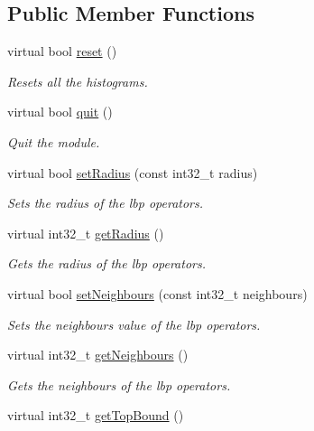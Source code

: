 \subsection*{Public Member Functions}
\begin{DoxyCompactItemize}
\item 
virtual bool \hyperlink{classlbpExtract__IDLServer_a9d9b1223c68851e94b0c8c0bd8d3cedc}{reset} ()
\begin{DoxyCompactList}\small\item\em Resets all the histograms. \end{DoxyCompactList}\item 
virtual bool \hyperlink{classlbpExtract__IDLServer_a4086feb2a3cee548670673235277b6f0}{quit} ()
\begin{DoxyCompactList}\small\item\em Quit the module. \end{DoxyCompactList}\item 
virtual bool \hyperlink{classlbpExtract__IDLServer_a2391f554973a3b7d32d6eea6bbb233d7}{set\+Radius} (const int32\+\_\+t radius)
\begin{DoxyCompactList}\small\item\em Sets the radius of the lbp operators. \end{DoxyCompactList}\item 
virtual int32\+\_\+t \hyperlink{classlbpExtract__IDLServer_a8c9a3adfcb9e7d37c4388bc3950da23b}{get\+Radius} ()
\begin{DoxyCompactList}\small\item\em Gets the radius of the lbp operators. \end{DoxyCompactList}\item 
virtual bool \hyperlink{classlbpExtract__IDLServer_aa72b58e41cf97d26825515cc9d5e6aa6}{set\+Neighbours} (const int32\+\_\+t neighbours)
\begin{DoxyCompactList}\small\item\em Sets the neighbours value of the lbp operators. \end{DoxyCompactList}\item 
virtual int32\+\_\+t \hyperlink{classlbpExtract__IDLServer_abf7693b9f3f63c2a16e163a3991b7d01}{get\+Neighbours} ()
\begin{DoxyCompactList}\small\item\em Gets the neighbours of the lbp operators. \end{DoxyCompactList}\item 
virtual int32\+\_\+t \hyperlink{classlbpExtract__IDLServer_a693ea8bf9638a27fdf3f7d40f7ad8f51}{get\+Top\+Bound} ()

\end{DoxyCompactItemize}
